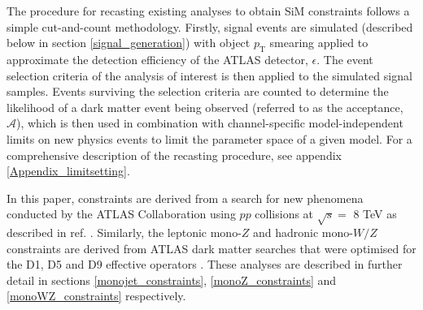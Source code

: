 The procedure for recasting existing \monoX analyses to obtain SiM constraints follows a simple cut-and-count methodology. Firstly, signal events are simulated (described below in section \ref{signal_generation}) with object $p_{\mathrm{T}}$ smearing applied to approximate the detection efficiency of the ATLAS detector, $\epsilon$. The event selection criteria of the \monoX analysis of interest is then applied to the simulated signal samples. Events surviving the selection criteria are counted to determine the likelihood of a dark matter event being observed (referred to as the acceptance, $\mathcal{A}$), which is then used in combination with channel-specific model-independent limits on new physics events to limit the parameter space of a given model.
For a comprehensive description of the recasting procedure, see appendix \ref{Appendix_limitsetting}.

In this paper, \monojet constraints are derived from a search for new phenomena conducted by the ATLAS Collaboration using $pp$ collisions at $\sqrt{s}=$ 8 TeV as described in ref. \cite{Aad:2015zva}. Similarly, the leptonic mono-$Z$ and hadronic mono-$W/Z$ constraints are derived from ATLAS dark matter searches that were optimised for the D1, D5 and D9 effective operators \cite{Aad:2014monoZlep,Aad:2013monoWZ}. These analyses are described in further detail in sections \ref{monojet_constraints}, \ref{monoZ_constraints} and \ref{monoWZ_constraints} respectively.

